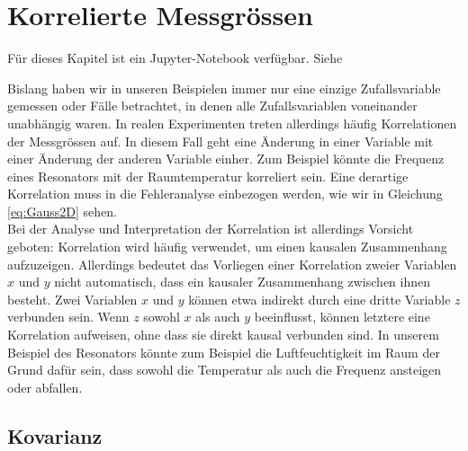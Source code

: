 \chapter{Korrelierte Messgrössen}
\label{chap:korrelation}

\begin{center}
\begin{tcolorbox}[enhanced,width=6in,center upper,
    fontupper=\large,drop fuzzy shadow southwest,
    colframe=blue!50!black,colback=blue!10]
Für dieses Kapitel ist ein Jupyter-Notebook verfügbar. Siehe  
\end{tcolorbox}
\end{center}

Bislang haben wir in unseren Beispielen immer nur eine einzige Zufallsvariable gemessen oder Fälle betrachtet, in denen alle Zufallsvariablen voneinander unabhängig waren. In realen Experimenten treten allerdings häufig Korrelationen der Messgrössen auf. In diesem Fall geht eine Änderung in einer Variable mit einer Änderung der anderen Variable einher. Zum Beispiel könnte die Frequenz eines Resonators mit der Raumtemperatur korreliert sein. Eine derartige Korrelation muss in die Fehleranalyse einbezogen werden, wie wir in Gleichung \ref{eq:Gauss2D} sehen. \\

Bei der Analyse und Interpretation der Korrelation ist allerdings Vorsicht geboten: Korrelation wird häufig verwendet, um einen kausalen Zusammenhang aufzuzeigen. Allerdings bedeutet das Vorliegen einer Korrelation zweier Variablen $x$ und $y$ nicht automatisch, dass ein kausaler Zusammenhang zwischen ihnen besteht. Zwei Variablen $x$ und $y$ können etwa indirekt durch eine dritte Variable $z$ verbunden sein. Wenn $z$ sowohl $x$ als auch $y$ beeinflusst, können letztere eine Korrelation aufweisen, ohne dass sie direkt kausal verbunden sind. In unserem Beispiel des Resonators könnte zum Beispiel die Luftfeuchtigkeit im Raum der Grund dafür sein, dass sowohl die Temperatur als auch die Frequenz ansteigen oder abfallen.

\section{Kovarianz}
\label{chap:korrelation:sec:kovarianz}

